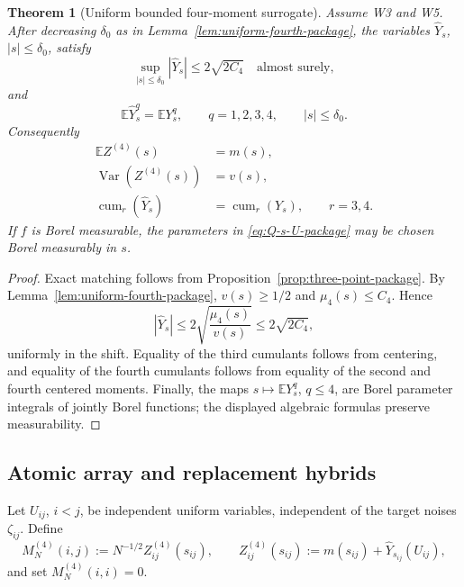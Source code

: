 \documentclass[11pt]{article}
\newtheorem{theorem}{Theorem}[section]
\theoremstyle{definition}
\theoremstyle{remark}
\newcommand{\E}{\mathbb E}
\newcommand{\Var}{\operatorname{Var}}
\newcommand{\cum}{\operatorname{cum}}
\begin{document}
\begin{theorem}[Uniform bounded four-moment surrogate]
\label{thm:uniform-four-surrogate-package}
Assume W3 and W5.  After decreasing \(\delta_0\) as in
Lemma~\ref{lem:uniform-fourth-package}, the variables
\(\widehat Y_s\), \(|s|\le\delta_0\), satisfy
\begin{equation}\label{eq:uniform-support-surrogate-package}
 \sup_{|s|\le\delta_0}|\widehat Y_s|
 \le 2\sqrt{2C_4}
 \quad\text{almost surely},
\end{equation}
and
\begin{equation}\label{eq:uniform-four-match-package}
 \E\widehat Y_s^q=\E Y_s^q,
 \qquad q=1,2,3,4,
 \qquad |s|\le\delta_0.
\end{equation}
Consequently
\begin{align}
 \E Z^{(4)}(s)&=m(s),\\
 \Var(Z^{(4)}(s))&=v(s),\\
 \cum_r(\widehat Y_s)&=\cum_r(Y_s),
 \qquad r=3,4.
\end{align}
If \(f\) is Borel measurable, the parameters in
\eqref{eq:Q-s-U-package} may be chosen Borel measurably in \(s\).
\end{theorem}

\begin{proof}
Exact matching follows from Proposition~\ref{prop:three-point-package}.  By
Lemma~\ref{lem:uniform-fourth-package},
\(v(s)\ge1/2\) and \(\mu_4(s)\le C_4\).  Hence
\[
 |\widehat Y_s|
 \le2\sqrt{\frac{\mu_4(s)}{v(s)}}
 \le2\sqrt{2C_4},
\]
uniformly in the shift.  Equality of the third cumulants follows from
centering, and equality of the fourth cumulants follows from equality of the
second and fourth centered moments.  Finally, the maps
\(s\mapsto\E Y_s^q\), \(q\le4\), are Borel parameter integrals of jointly
Borel functions; the displayed algebraic formulas preserve measurability.
\end{proof}

\subsection{Atomic array and replacement hybrids}

Let \(U_{ij}\), \(i<j\), be independent uniform variables, independent of the
target noises \(\zeta_{ij}\).  Define
\begin{equation}\label{eq:atomic-array-package}
 M_N^{(4)}(i,j)
 :=N^{-1/2}Z^{(4)}_{ij}(s_{ij}),
 \qquad
 Z^{(4)}_{ij}(s_{ij})
 :=m(s_{ij})+\widehat Y_{s_{ij}}(U_{ij}),
\end{equation}
and set \(M_N^{(4)}(i,i)=0\).
\end{document}
